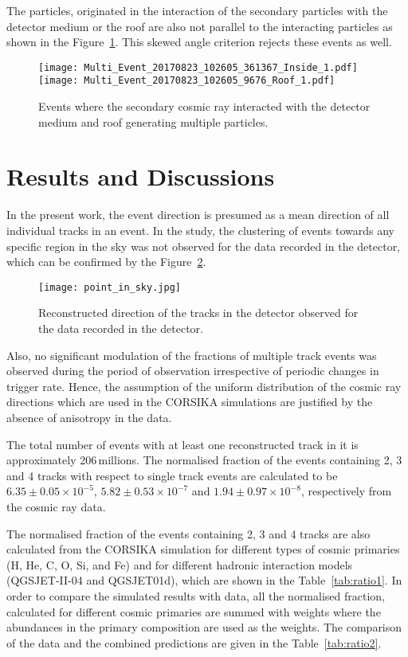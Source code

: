 The particles, originated in the interaction of the secondary particles
with the detector medium or the roof are also not parallel to the
interacting particles as shown in the Figure~\ref{fig:eventinside}.
This skewed angle criterion rejects these events as well.
\begin{figure}[h]
  \texttt{[image: Multi\_Event\_20170823\_102605\_361367\_Inside\_1.pdf]}
  \texttt{[image: Multi\_Event\_20170823\_102605\_9676\_Roof\_1.pdf]}
  \caption{Events where the secondary cosmic ray interacted with
    the detector medium and roof generating multiple particles.}
  \label{fig:eventinside}
\end{figure}


\section{Results and Discussions} \label{sec:result}
In the present work, the event direction is presumed as a mean
direction of all individual tracks in an event. In the study, the
clustering of events towards any specific region in the sky was
not observed for the data recorded in the detector,
which can be confirmed by the Figure~\ref{fig:pinsk}.
\begin{figure}[h]
  \centering
  \texttt{[image: point\_in\_sky.jpg]} 
  \caption{Reconstructed direction of the tracks in the detector observed for the
    data recorded in the detector.}
  \label{fig:pinsk}
\end{figure}
Also, no significant
modulation of the fractions of multiple track events was observed
during the period of observation irrespective of periodic changes
in trigger rate. 
Hence, the assumption of the uniform distribution of the cosmic ray
directions which are used in the CORSIKA simulations are justified
by the absence of anisotropy in the data.

The total number of events with at least one reconstructed track in it
is approximately 206\,millions.
The normalised fraction of the events containing 2, 3 and 4 tracks
with respect to single track events are calculated to be
$6.35\pm 0.05\times 10^{-5}$, $5.82\pm 0.53\times 10^{-7}$ and
$1.94\pm 0.97\times 10^{-8}$, respectively from the cosmic ray data.

The normalised fraction of the events containing 2, 3 and 4 tracks
are also calculated from the CORSIKA simulation for different types
of cosmic primaries (H, He, C, O, Si, and Fe) and for different
hadronic interaction models (QGSJET-II-04 and QGSJET01d), which are
shown in the Table~\ref{tab:ratio1}. In order to compare the simulated
results with data, all the normalised fraction, calculated for
different cosmic primaries are summed with weights where the
abundances in the primary composition\cite{cosmic1,pdgspectra1} are
used as the weights. The
comparison of the data and the combined predictions are given in
the Table~\ref{tab:ratio2}.

